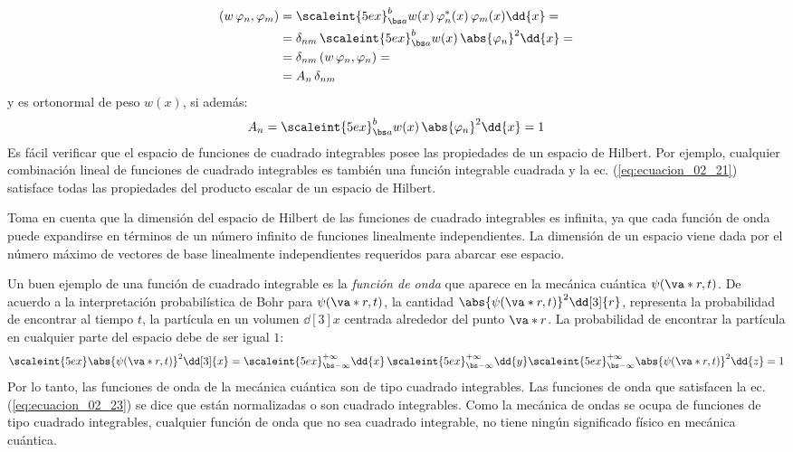 \begin{align*}
(w \, \varphi_{n}, \varphi_{m}) &= \scaleint{5ex}_{\bs a}^{b} w(x) \,  \varphi_{n}^{*} (x) \, \varphi_{m} (x) \dd{x} = \\
&=\delta_{nm} \, \scaleint{5ex}_{\bs a}^{b} w(x) \, \abs{\varphi_{n}}^{2} \dd{x} = \\
&= \delta_{nm} \, (w \, \varphi_{n}, \varphi_{n}) = \\
&= A_{n} \, \delta_{nm}
\end{align*}
y es ortonormal de peso $w(x)$, si además:
\begin{align*}
A_{n} = \scaleint{5ex}_{\bs a}^{b} w(x) \, \abs{\varphi_{n}}^{2} \dd{x} = 1
\end{align*}
\vfill{}
Es fácil verificar que el espacio de funciones de cuadrado integrables posee las propiedades de un espacio de Hilbert. Por ejemplo, cualquier combinación lineal de funciones de cuadrado integrables es también una función integrable cuadrada y la ec. (\ref{eq:ecuacion_02_21}) satisface todas las propiedades del producto escalar de un espacio de Hilbert.
\par
Toma en cuenta que la dimensión del espacio de Hilbert de las funciones de cuadrado integrables es infinita, ya que cada función de onda puede expandirse en términos de un número infinito de funciones linealmente independientes. La dimensión de un espacio viene dada por el número máximo de vectores de base linealmente independientes requeridos para abarcar ese espacio.
\par
Un buen ejemplo de una función de cuadrado integrable es la \emph{función de onda} que aparece en la mecánica cuántica $\psi (\va*{r}, t)$. De acuerdo a la interpretación probabilística de Bohr para $\psi (\va*{r}, t)$, la cantidad $\abs{\psi (\va*{r}, t)}^{2} \dd[3]{r}$, representa la probabilidad de encontrar al tiempo $t$, la partícula en un volumen $\dd[3]{x}$ centrada alrededor del punto $\va*{r}$. La probabilidad de encontrar la partícula en cualquier parte del espacio debe de ser igual $1$:
\begin{equation}
\scaleint{5ex} \abs{\psi (\va*{r}, t)}^{2} \dd[3]{x} = \scaleint{5ex}_{\bs -\infty}^{+\infty} \dd{x} \, \scaleint{5ex}_{\bs -\infty}^{+\infty} \dd{y} \scaleint{5ex}_{\bs -\infty}^{+\infty} \abs{\psi (\va*{r}, t)}^{2} \dd{z} = 1
\label{eq:ecuacion_02_23}
\end{equation}
Por lo tanto, las funciones de onda de la mecánica cuántica son de tipo cuadrado integrables. Las funciones de onda que satisfacen la ec. (\ref{eq:ecuacion_02_23}) se dice que están normalizadas o son cuadrado integrables. Como la mecánica de ondas se ocupa de funciones de tipo cuadrado integrables, cualquier función de onda que no sea cuadrado integrable, no tiene ningún significado físico en mecánica cuántica.
